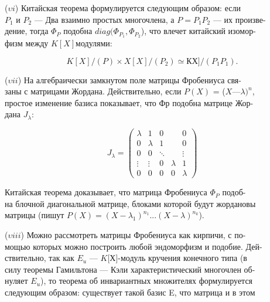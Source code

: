 \documentclass{../template/mai_book}
\begin{document}
\medskip

($\upsilon\mathit {i} $) Китайская теорема формулируется следующим образом: если\\ $P_1$ и $P_2$ — Два взаимно простых многочлена, а $P=P_1P_2$ — их произве-\\дение, тогда $ \Phi_P$ подобна $diag( \Phi_{P_1},\Phi_{P_2}$), что влечет китайский изомор-\\физм между $K[X]$модулями: 

\medskip

$$K[X]/(P) \times X[X]/(P_2) \simeq КХ]/(P_1P_1).$$ 

\medskip

($\upsilon\mathit{ii} $) На алгебраически замкнутом поле матрицы Фробениуса свя-\\заны с матрицами Жордана. Действительно, если $P(X)$ = ($X — \lambda)^n$,\\простое изменение базиса показывает, что Фр подобна матрице 
Жор-\\дана $J_{\lambda}$:

$$J_{\lambda} = \begin{pmatrix}
\lambda & 1 & 0 & \; & 0 \\
0 & \lambda & 1 & \; & 0 \\
0 & 0 & \ddots & \; & \vdots \\
\vdots & \vdots & 0 & \lambda & 1 \\
0 & 0 & 0 & 0 & \lambda
\end{pmatrix}
$$

\medskip

\noindent Китайская теорема доказывает, что матрица Фробениуса $\Phi_P$ 
подоб-\\на блочной диагональной матрице, блоками которой будут жордановы\\ матрицы (пишут $P(X) = (X-\lambda_1)^{n_1}...(X - \lambda)^{n_k}$).

\medskip

($\upsilon\mathit{iii} $) Можно рассмотреть матрицы Фробениуса как кирпичи, с по-\\мощью которых можно построить любой эндоморфизм и подобие. Дей-\\ствительно, так как $E_u$ — $\mathit{K}$[Х]-модуль кручения конечного типа (в\\силу теоремы Гамильтона — Кэли характеристический многочлен об-\\нуляет $E_u$), то теорема об инвариантных множителях формулируется\\ следующим образом: существует такой базис E, что матрица и в этом
\end{document}
